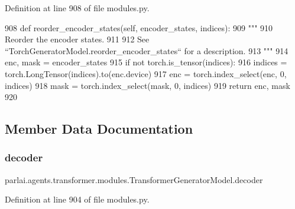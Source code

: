Definition at line 908 of file modules.\+py.


\begin{DoxyCode}
908     \textcolor{keyword}{def }reorder\_encoder\_states(self, encoder\_states, indices):
909         \textcolor{stringliteral}{"""}
910 \textcolor{stringliteral}{        Reorder the encoder states.}
911 \textcolor{stringliteral}{}
912 \textcolor{stringliteral}{        See ``TorchGeneratorModel.reorder\_encoder\_states`` for a description.}
913 \textcolor{stringliteral}{        """}
914         enc, mask = encoder\_states
915         \textcolor{keywordflow}{if} \textcolor{keywordflow}{not} torch.is\_tensor(indices):
916             indices = torch.LongTensor(indices).to(enc.device)
917         enc = torch.index\_select(enc, 0, indices)
918         mask = torch.index\_select(mask, 0, indices)
919         \textcolor{keywordflow}{return} enc, mask
920 
\end{DoxyCode}


\subsection{Member Data Documentation}
\mbox{\label{classparlai_1_1agents_1_1transformer_1_1modules_1_1TransformerGeneratorModel_a6467f0fdec226329cb8efe77245996a5}} 
\subsubsection{\texorpdfstring{decoder}{decoder}}
{\footnotesize\ttfamily parlai.\+agents.\+transformer.\+modules.\+Transformer\+Generator\+Model.\+decoder}



Definition at line 904 of file modules.\+py.

\mbox{\label{classparlai_1_1agents_1_1transformer_1_1modules_1_1TransformerGeneratorModel_a18411754103e8c8f4cd2e9338351b98d}} 
